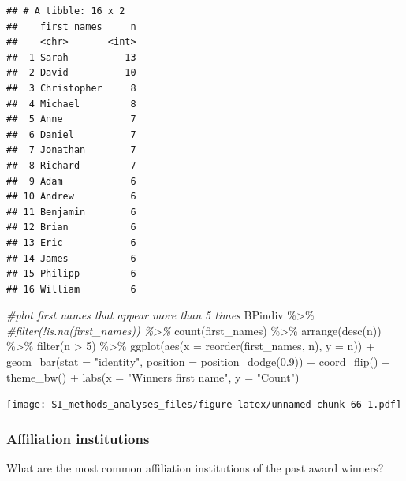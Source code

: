 \documentclass[
]{article}
\newenvironment{Shaded}{\begin{snugshade}}{\end{snugshade}}
\newcommand{\AttributeTok}[1]{\textcolor[rgb]{0.77,0.63,0.00}{#1}}
\newcommand{\CommentTok}[1]{\textcolor[rgb]{0.56,0.35,0.01}{\textit{#1}}}
\newcommand{\DecValTok}[1]{\textcolor[rgb]{0.00,0.00,0.81}{#1}}
\newcommand{\FloatTok}[1]{\textcolor[rgb]{0.00,0.00,0.81}{#1}}
\newcommand{\FunctionTok}[1]{\textcolor[rgb]{0.00,0.00,0.00}{#1}}
\newcommand{\NormalTok}[1]{#1}
\newcommand{\SpecialCharTok}[1]{\textcolor[rgb]{0.00,0.00,0.00}{#1}}
\newcommand{\StringTok}[1]{\textcolor[rgb]{0.31,0.60,0.02}{#1}}
\begin{document}
\begin{verbatim}
## # A tibble: 16 x 2
##    first_names     n
##    <chr>       <int>
##  1 Sarah          13
##  2 David          10
##  3 Christopher     8
##  4 Michael         8
##  5 Anne            7
##  6 Daniel          7
##  7 Jonathan        7
##  8 Richard         7
##  9 Adam            6
## 10 Andrew          6
## 11 Benjamin        6
## 12 Brian           6
## 13 Eric            6
## 14 James           6
## 15 Philipp         6
## 16 William         6
\end{verbatim}

\begin{Shaded}
\begin{Highlighting}[]
\CommentTok{\#plot first names that appear more than 5 times}
\NormalTok{BPindiv }\SpecialCharTok{\%\textgreater{}\%} 
  \CommentTok{\#filter(!is.na(first\_names)) \%\textgreater{}\% }
  \FunctionTok{count}\NormalTok{(first\_names) }\SpecialCharTok{\%\textgreater{}\%} 
  \FunctionTok{arrange}\NormalTok{(}\FunctionTok{desc}\NormalTok{(n)) }\SpecialCharTok{\%\textgreater{}\%}
  \FunctionTok{filter}\NormalTok{(n }\SpecialCharTok{\textgreater{}} \DecValTok{5}\NormalTok{) }\SpecialCharTok{\%\textgreater{}\%}
  \FunctionTok{ggplot}\NormalTok{(}\FunctionTok{aes}\NormalTok{(}\AttributeTok{x =} \FunctionTok{reorder}\NormalTok{(first\_names, n), }\AttributeTok{y =}\NormalTok{ n)) }\SpecialCharTok{+}
  \FunctionTok{geom\_bar}\NormalTok{(}\AttributeTok{stat =} \StringTok{"identity"}\NormalTok{, }\AttributeTok{position =} \FunctionTok{position\_dodge}\NormalTok{(}\FloatTok{0.9}\NormalTok{)) }\SpecialCharTok{+}
  \FunctionTok{coord\_flip}\NormalTok{() }\SpecialCharTok{+}
  \FunctionTok{theme\_bw}\NormalTok{() }\SpecialCharTok{+}
  \FunctionTok{labs}\NormalTok{(}\AttributeTok{x =} \StringTok{"Winners first name"}\NormalTok{, }\AttributeTok{y =} \StringTok{"Count"}\NormalTok{)   }
\end{Highlighting}
\end{Shaded}

\texttt{[image: SI\_methods\_analyses\_files/figure-latex/unnamed-chunk-66-1.pdf]}

\hypertarget{affiliation-institutions}{%
\subsubsection{Affiliation
institutions}\label{affiliation-institutions}}

What are the most common affiliation institutions of the past award
winners?
\end{document}
